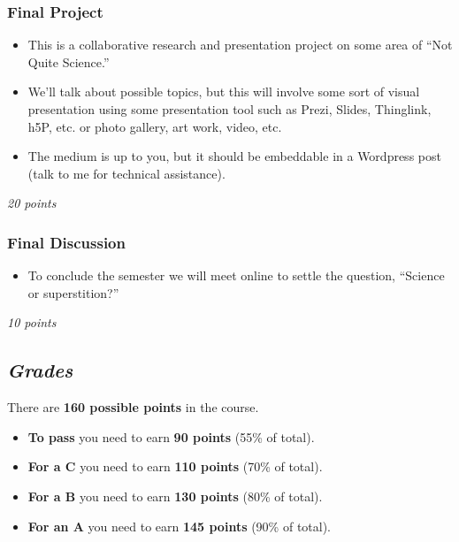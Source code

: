 \documentclass[
]{article}
\providecommand{\tightlist}{%
  \setlength{\itemsep}{0pt}\setlength{\parskip}{0pt}}
\begin{document}
\begin{assignment}

\hypertarget{final-project}{%
\subsubsection{Final Project}\label{final-project}}

\begin{itemize}
\tightlist
\item
  This is a collaborative research and presentation project on some area
  of ``Not Quite Science.''
\item
  We'll talk about possible topics, but this will involve some sort of
  visual presentation using some presentation tool such as Prezi,
  Slides, Thinglink, h5P, etc. or photo gallery, art work, video, etc.
\item
  The medium is up to you, but it should be embeddable in a Wordpress
  post (talk to me for technical assistance).
\end{itemize}

\emph{20 points}

\end{assignment}

\begin{assignment}

\hypertarget{final-discussion}{%
\subsubsection{Final Discussion}\label{final-discussion}}

\begin{itemize}
\tightlist
\item
  To conclude the semester we will meet online to settle the question,
  ``Science or superstition?''
\end{itemize}

\emph{10 points}

\end{assignment}

\hypertarget{grades}{%
\subsection{\texorpdfstring{\emph{Grades}}{Grades}}\label{grades}}

\begin{caution}

There are \textbf{160 possible points} in the course.

\begin{itemize}
\tightlist
\item
  \textbf{To pass} you need to earn \textbf{90 points} (55\% of total).
\item
  \textbf{For a C} you need to earn \textbf{110 points} (70\% of total).
\item
  \textbf{For a B} you need to earn \textbf{130 points} (80\% of total).
\item
  \textbf{For an A} you need to earn \textbf{145 points} (90\% of
  total).
\end{itemize}

\end{caution}
\end{document}
